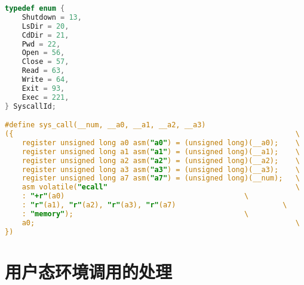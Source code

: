 \begin{lstlisting}[language={C}, caption={U-Mode环境调用}, label={lst:shell}]
typedef enum {
	Shutdown = 13,
	LsDir = 20,
	CdDir = 21,
	Pwd = 22,
	Open = 56,
	Close = 57,
	Read = 63,
	Write = 64,
	Exit = 93,
	Exec = 221,
} SyscallId;

#define sys_call(__num, __a0, __a1, __a2, __a3)                          \
({                                                                  \
	register unsigned long a0 asm("a0") = (unsigned long)(__a0);    \
	register unsigned long a1 asm("a1") = (unsigned long)(__a1);    \
	register unsigned long a2 asm("a2") = (unsigned long)(__a2);    \
	register unsigned long a3 asm("a3") = (unsigned long)(__a3);    \
	register unsigned long a7 asm("a7") = (unsigned long)(__num);   \
	asm volatile("ecall"                                            \
	: "+r"(a0)                                          \
	: "r"(a1), "r"(a2), "r"(a3), "r"(a7)                         \
	: "memory");                                        \
	a0;                                                             \
})
\end{lstlisting}

\section{用户态环境调用的处理}

